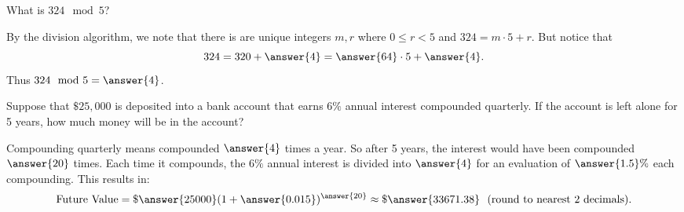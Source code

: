 \documentclass{ximera}
\begin{document}
\begin{question}
What is $324 \mod 5$?
\begin{explanation}
By the division algorithm, we note that there is are unique integers $m, r$ where $0\leq r<5$ and $324=m\cdot 5+r$.  But notice that $$324=320+\answer{4}=\answer{64}\cdot 5+\answer{4}.$$  Thus $324 \mod 5=\answer{4}$.
\end{explanation}
\end{question}

\begin{question}
Suppose that $\$25,000$ is deposited into a bank account that earns $6\%$ annual interest compounded quarterly.  If the account is left alone for 5 years, how much money will be in the account?

\begin{explanation}
Compounding quarterly means compounded $\answer{4}$ times a year.  So after 5 years, the interest would have been compounded $\answer{20}$ times.  Each time it compounds, the $6\%$ annual interest is divided into $\answer{4}$ for an evaluation of $\answer{1.5}\%$ each compounding.  This results in: $$\text{Future Value}=\$\answer{25000}(1+\answer{0.015})^{\answer{20}}\approx\$\answer{33671.38}\ \text{ (round to nearest 2 decimals).}$$
\end{explanation}

\end{question}
\end{document}
